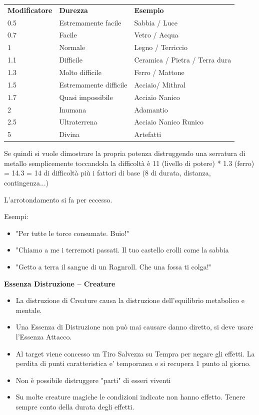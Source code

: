 \documentclass[a4paper,11pt,twoside,openany]{book}
\begin{document}
\medskip
\begin{tabular}{lll}
	\toprule
	\textbf{Modificatore} & \textbf{Durezza}       & \textbf{Esempio}\\
	0.5                   & Estremamente facile    & Sabbia / Luce \\
	0.7                   & Facile                 & Vetro / Acqua\\
	1                     & Normale                & Legno / Terriccio\\
	1.1                   & Difficile              & Ceramica / Pietra / Terra dura\\
	1.3                   & Molto difficile        & Ferro / Mattone\\
	1.5                   & Estremamente difficile & Acciaio/ Mithral\\
	1.7                   & Quasi impossibile      & Acciaio Nanico\\
	2                     & Inumana                & Adamantio\\
	2.5                   & Ultraterrena           & Acciaio Nanico Runico\\
	5                     & Divina                 & Artefatti\\
\end{tabular}

\bigskip

Se quindi si vuole dimostrare la propria potenza distruggendo una serratura di metallo semplicemente toccandola la difficoltà è 11 (livello di potere) {*} 1.3 (ferro) = 14.3 = 14 di difficoltà più i fattori di base (8 di durata, distanza, contingenza...)

L'arrotondamento si fa per eccesso.

Esempi:
\begin{itemize}
	\item
	      "Per tutte le torce consumate. Buio!"
	\item
	      "Chiamo a me i terremoti passati. Il tuo castello crolli come la sabbia
	\item
	      "Getto a terra il sangue di un Ragnroll. Che una fossa ti colga!"
\end{itemize}


\textbf{Essenza Distruzione -- Creature}
\begin{itemize}
	\item
	      La distruzione di Creature causa la distruzione dell'equilibrio metabolico e mentale.
	\item
	      Una Essenza di Distruzione non può mai causare danno diretto, si deve usare l'Essenza Attacco.
	\item
	      Al target viene concesso un Tiro Salvezza su Tempra per negare gli effetti. La perdita di punti caratteristica e' temporanea e si recupera 1 punto al giorno.
	\item
	      Non è possibile distruggere "parti" di esseri viventi
	\item
	      Su molte creature magiche le condizioni indicate non hanno effetto. Tenere sempre conto della durata degli effetti.
\end{itemize}
\end{document}

